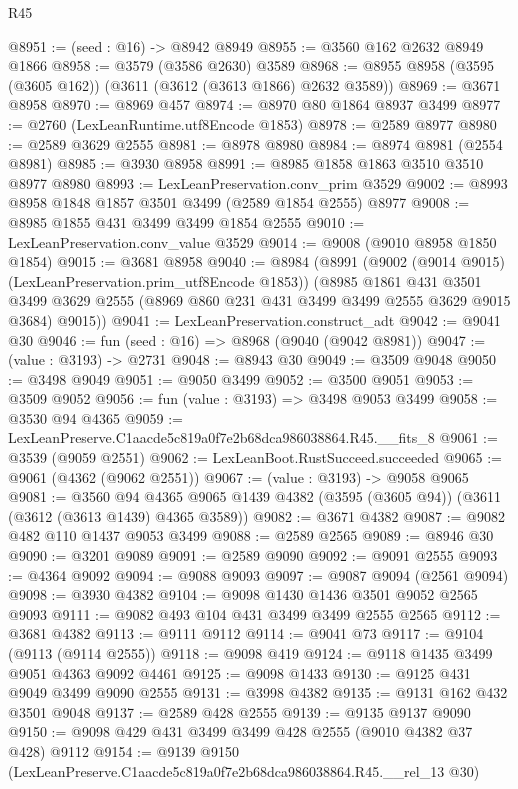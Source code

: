 \begin{lexlean}{R45}
\begin{coremodule}
@8951 := (seed : @16) -> @8942 @8949
@8955 := @3560 @162 @2632 @8949 @1866
@8958 := @3579 (@3586 @2630) @3589
@8968 := @8955 @8958 (@3595 (@3605 @162)) (@3611 (@3612 (@3613 @1866) @2632 @3589))
@8969 := @3671 @8958
@8970 := @8969 @457
@8974 := @8970 @80 @1864 @8937 @3499
@8977 := @2760 (LexLeanRuntime.utf8Encode @1853)
@8978 := @2589 @8977
@8980 := @2589 @3629 @2555
@8981 := @8978 @8980
@8984 := @8974 @8981 (@2554 @8981)
@8985 := @3930 @8958
@8991 := @8985 @1858 @1863 @3510 @3510 @8977 @8980
@8993 := LexLeanPreservation.conv_prim @3529
@9002 := @8993 @8958 @1848 @1857 @3501 @3499 (@2589 @1854 @2555) @8977
@9008 := @8985 @1855 @431 @3499 @3499 @1854 @2555
@9010 := LexLeanPreservation.conv_value @3529
@9014 := @9008 (@9010 @8958 @1850 @1854)
@9015 := @3681 @8958
@9040 := @8984
    (@8991
      (@9002 (@9014 @9015) (LexLeanPreservation.prim_utf8Encode @1853))
      (@8985
        @1861
        @431
        @3501
        @3499
        @3629
        @2555
        (@8969 @860 @231 @431 @3499 @3499 @2555 @3629 @9015 @3684)
        @9015))
@9041 := LexLeanPreservation.construct_adt
@9042 := @9041 @30
@9046 := fun (seed : @16) => @8968 (@9040 (@9042 @8981))
@9047 := (value : @3193) -> @2731
@9048 := @8943 @30
@9049 := @3509 @9048
@9050 := @3498 @9049
@9051 := @9050 @3499
@9052 := @3500 @9051
@9053 := @3509 @9052
@9056 := fun (value : @3193) => @3498 @9053 @3499
@9058 := @3530 @94 @4365
@9059 := LexLeanPreserve.C1aacde5c819a0f7e2b68dca986038864.R45.__fits_8
@9061 := @3539 (@9059 @2551)
@9062 := LexLeanBoot.RustSucceed.succeeded
@9065 := @9061 (@4362 (@9062 @2551))
@9067 := (value : @3193) -> @9058 @9065
@9081 := @3560
    @94
    @4365
    @9065
    @1439
    @4382
    (@3595 (@3605 @94))
    (@3611 (@3612 (@3613 @1439) @4365 @3589))
@9082 := @3671 @4382
@9087 := @9082 @482 @110 @1437 @9053 @3499
@9088 := @2589 @2565
@9089 := @8946 @30
@9090 := @3201 @9089
@9091 := @2589 @9090
@9092 := @9091 @2555
@9093 := @4364 @9092
@9094 := @9088 @9093
@9097 := @9087 @9094 (@2561 @9094)
@9098 := @3930 @4382
@9104 := @9098 @1430 @1436 @3501 @9052 @2565 @9093
@9111 := @9082 @493 @104 @431 @3499 @3499 @2555 @2565
@9112 := @3681 @4382
@9113 := @9111 @9112
@9114 := @9041 @73
@9117 := @9104 (@9113 (@9114 @2555))
@9118 := @9098 @419
@9124 := @9118 @1435 @3499 @9051 @4363 @9092 @4461
@9125 := @9098 @1433
@9130 := @9125 @431 @9049 @3499 @9090 @2555
@9131 := @3998 @4382
@9135 := @9131 @162 @432 @3501 @9048
@9137 := @2589 @428 @2555
@9139 := @9135 @9137 @9090
@9150 := @9098 @429 @431 @3499 @3499 @428 @2555 (@9010 @4382 @37 @428) @9112
@9154 := @9139 @9150 (LexLeanPreserve.C1aacde5c819a0f7e2b68dca986038864.R45.__rel_13 @30)

\end{coremodule}
\end{lexlean}
